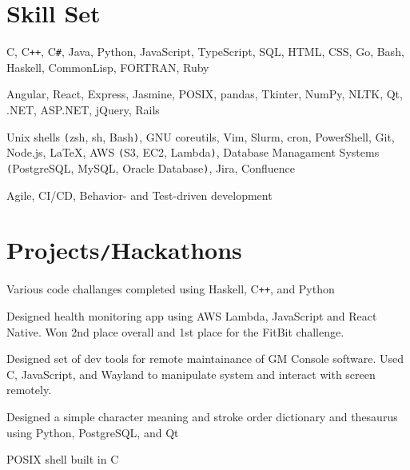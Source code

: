 \documentclass[11pt]{article}
\begin{document}
\vspace*{-10pt}
\section*{Skill Set}
\vspace*{-10pt}\hspace*{10pt}\begin{minipage}{0.935\textwidth}
    \begin{description}
        \raggedright
        \item[Languages] C, C\texttt{++}, C\texttt{\#}, Java, Python, JavaScript, TypeScript, SQL, HTML, CSS, Go, Bash, Haskell,
            CommonLisp, FORTRAN, Ruby 
        \item[Frameworks\texttt{/}Libraries] Angular, React, Express, Jasmine, POSIX, pandas, Tkinter, NumPy, NLTK,
            Qt, .NET, ASP.NET, jQuery, Rails
        \item[Tools] Unix shells \texttt{(}zsh, sh, Bash\texttt{)}, GNU coreutils, Vim, Slurm, cron, PowerShell, Git, Node.js,
            \LaTeX, AWS \texttt{(}S3, EC2, Lambda\texttt{)}, Database Managament Systems \texttt{(}PostgreSQL, MySQL, Oracle
            Database\texttt{)}, Jira, Confluence
        \item[Methodologies] Agile, CI/CD, Behavior- and Test-driven development
    \end{description}
\end{minipage}

\vspace*{-10pt}
\section*{Projects\texttt{/}Hackathons}
\vspace*{-10pt}\hspace*{10pt}\begin{minipage}{0.93\textwidth}
    \begin{description}
        \raggedright
        \item[Advent of Code] Various code challanges completed using Haskell, C\texttt{++}, and Python
        \item[DHack] Designed health monitoring app using AWS Lambda, JavaScript and React Native. Won 2nd place overall and 1st
            place for the FitBit challenge.
        \item[MHacks 8] Designed set of dev tools for remote maintainance of GM Console software. Used C, JavaScript, and
            Wayland to manipulate system and interact with screen remotely.
        \item[Chinese Character Dictionary] Designed a simple character meaning and stroke order dictionary and thesaurus using
            Python, PostgreSQL, and Qt
        \item[Mock Terminal] POSIX shell built in C
    \end{description}
\end{minipage}
\end{document}
